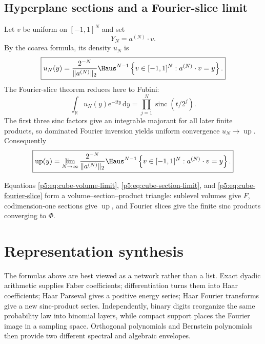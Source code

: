 \documentclass[11pt,oneside]{article}
\theoremstyle{definition}
\newcommand{\dd}{\,\mathrm d}
\newcommand{\e}{\mathrm e}
\newcommand{\ii}{\mathrm i}
\newcommand{\R}{\mathbb R}
\newcommand{\Up}{\operatorname{up}}
\newcommand{\sinc}{\operatorname{sinc}}
\begin{document}
\subsection{Hyperplane sections and a Fourier-slice limit}

Let $v$ be uniform on $[-1,1]^N$ and set
\begin{equation}
 Y_N=a^{(N)}\cdot v.
\end{equation}
By the coarea formula, its density $u_N$ is
\begin{equation}
 \boxed{\displaystyle
 u_N(y)=\frac{2^{-N}}{\|a^{(N)}\|_2}
 \Haus^{N-1}
 \left\{v\in[-1,1]^N:a^{(N)}\cdot v=y\right\}.}         \label{p5:eq:cube-section-density}
\end{equation}
The Fourier-slice theorem reduces here to Fubini:
\begin{equation}
 \int_{\R}u_N(y)\e^{-\ii ty}\dd y
 =\prod_{j=1}^{N}\sinc(t/2^j).                           \label{p5:eq:cube-fourier-slice}
\end{equation}
The first three sinc factors give an integrable majorant for all later finite
products, so dominated Fourier inversion yields uniform convergence
$u_N\to\Up$.  Consequently
\begin{equation}
 \boxed{\displaystyle
 \Up(y)=\lim_{N\to\infty}
 \frac{2^{-N}}{\|a^{(N)}\|_2}
 \Haus^{N-1}
 \left\{v\in[-1,1]^N:a^{(N)}\cdot v=y\right\}.}         \label{p5:eq:cube-section-limit}
\end{equation}

Equations \eqref{p5:eq:cube-volume-limit}, \eqref{p5:eq:cube-section-limit}, and
\eqref{p5:eq:cube-fourier-slice} form a volume--section--product triangle:
sublevel volumes give $F$, codimension-one sections give $\Up$, and Fourier
slices give the finite sinc products converging to $\Phi$.

\section{Representation synthesis}
\label{p5:sec:synthesis}

The formulas above are best viewed as a network rather than a list.  Exact
dyadic arithmetic supplies Faber coefficients; differentiation turns them
into Haar coefficients; Haar Parseval gives a positive energy series; Haar
Fourier transforms give a new sinc-product series.  Independently, binary
digits reorganize the same probability law into binomial layers, while
compact support places the Fourier image in a sampling space.  Orthogonal
polynomials and Bernstein polynomials then provide two different spectral and
algebraic envelopes.
\end{document}

